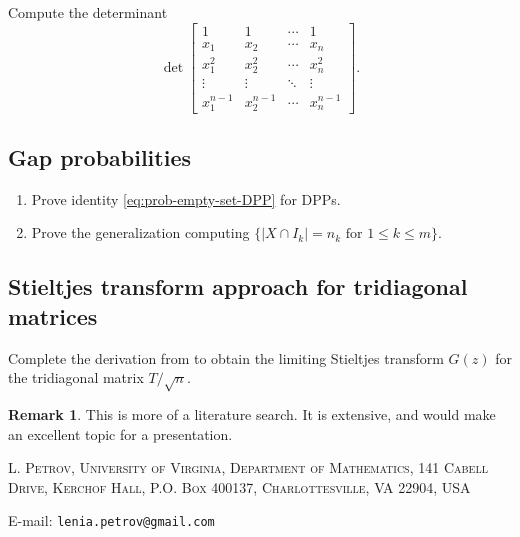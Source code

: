 \documentclass[letterpaper,11pt,oneside,reqno]{article}
\numberwithin{equation}{section}
\theoremstyle{definition}
\newtheorem{remark}[proposition]{Remark}
\begin{document}
Compute the determinant
\begin{equation*}
	\det\left[
		\begin{array}{cccc}
			1 & 1 & \cdots & 1 \\
			x_1 & x_2 & \cdots & x_n \\
			x_1^2 & x_2^2 & \cdots & x_n^2 \\
			\vdots & \vdots & \ddots & \vdots \\
			x_1^{n-1} & x_2^{n-1} & \cdots & x_n^{n-1}
		\end{array}
	\right].
\end{equation*}

\subsection{Gap probabilities}

\begin{enumerate}
	\item
Prove identity
\eqref{eq:prob-empty-set-DPP} for DPPs.
\item Prove the generalization computing
	\(\{|X\cap I_k|=n_k\text{ for }1\le k\le m\}\).
\end{enumerate}


\subsection{Stieltjes transform approach for tridiagonal matrices}
\label{prob:resolvent-diff-eq}

Complete the derivation from  to obtain the limiting Stieltjes transform $G(z)$ for the tridiagonal matrix $T/\sqrt{n}$.

\begin{remark}
	This is more of a literature search. It is extensive, and
	would make an excellent topic for a presentation.
\end{remark}





\medskip

\textsc{L. Petrov, University of Virginia, Department of Mathematics, 141 Cabell Drive, Kerchof Hall, P.O. Box 400137, Charlottesville, VA 22904, USA}

E-mail: \texttt{lenia.petrov@gmail.com}
\end{document}

